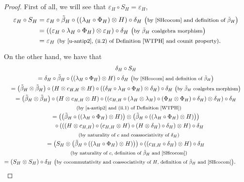 \documentclass[10pt,a4paper]{amsart}
\numberwithin{equation}{section}
\begin{document}
\begin{proof}
First of all, we will see that $\varepsilon_{H}\circ S_{H}=\varepsilon_{H}$,
\begin{align*}
\varepsilon_{H}\circ S_{H}
={}&\varepsilon_{H}\circ\tilde{\beta}_{H}\circ((\lambda_{H}\circ\Phi_{H})\otimes H)\circ\delta_{H}\ \text{\footnotesize\textnormal{\big(by \eqref{SHcocom} and definition of $\tilde{\beta}_{H}$\big)}}\\
={}&((\varepsilon_{H}\circ\lambda_{H}\circ\Phi_{H})\otimes\varepsilon_{H})\circ\delta_{H}\ \text{\footnotesize\textnormal{\big(by $\tilde{\beta}_{H}$ coalgebra morphism\big)}}\\
={}&\varepsilon_{H}\ \text{\footnotesize\textnormal{(by \eqref{u-antip2}, (ii.2) of Definition \ref{WTPH} and counit property)}}.
\end{align*}

On the other hand, we have that
\begin{gather*}
 \delta_{H}\circ S_{H}\\
 = \delta_{H}\circ\tilde{\beta}_{H}\circ((\lambda_{H}\circ\Phi_{H})\otimes H)\circ\delta_{H}\ \text{\footnotesize\textnormal{\big(by \eqref{SHcocom} and definition of $\tilde{\beta}_{H}$\big)}}\\
 = \bigl(\tilde{\beta}_{H}\otimes \tilde{\beta}_{H}\bigr)\circ(H\otimes c_{H,H}\otimes H)\circ((\delta_{H}\circ\lambda_{H}\circ\Phi_{H})\otimes\delta_{H})\circ\delta_{H}\ \text{\footnotesize\textnormal{\big(by $\tilde{\beta}_{H}$ coalgebra morphism\big)}}\\
 = \bigl(\tilde{\beta}_{H}\otimes \tilde{\beta}_{H}\bigr)\circ(H\otimes c_{H,H}\otimes H)\circ((c_{H,H}\circ(\lambda_{H}\otimes\lambda_{H})\circ(\Phi_{H}\otimes\Phi_{H})\circ\delta_{H} )\otimes\delta_{H})\circ\delta_{H}\\
 \quad{} \text{\footnotesize\textnormal{(by \eqref{a-antip2} and (ii.1) of Definition \ref{WTPH})}}\\
 = \bigl(\bigl(\tilde{\beta}_{H}\circ((\lambda_{H}\circ\Phi_{H})\otimes H)\bigr)\otimes\bigl(\tilde{\beta}_{H}\circ((\lambda_{H}\circ\Phi_{H})\otimes H)\bigr)\bigr)\\
 \quad{} \circ(((H\otimes c_{H,H})\circ(c_{H,H}\otimes H)\circ(H\otimes\delta_{H})\circ\delta_{H})\otimes H)\circ\delta_{H}\\
 \quad{} \text{\footnotesize\textnormal{(by naturality of $c$ and coassociativity of $\delta_{H}$)}}\\
 = \bigl(S_{H}\otimes\bigl(\tilde{\beta}_{H}\circ((\lambda_{H}\circ\Phi_{H})\otimes H)\bigr)\bigr)\circ((c_{H,H}\circ\delta_{H})\otimes H)\circ\delta_{H}\\
 \quad{} \text{\footnotesize\textnormal{(by naturality of $c$, definition of $\tilde{\beta}_{H}$ and \eqref{SHcocom})}}\\
 = (S_{H}\otimes S_{H})\circ\delta_{H}\ \text{\footnotesize\textnormal{\big(by cocommutativity and coassociativity of $H$, definition of $\tilde{\beta}_{H}$ and \eqref{SHcocom}\big)}}.\tag*{\qed}
\end{gather*}
\renewcommand{\qed}{}
\end{proof}
\end{document}
